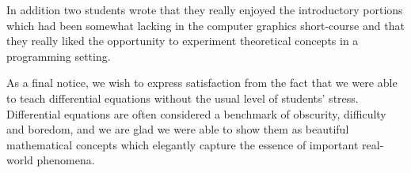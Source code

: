 In addition two students wrote that they really enjoyed the introductory portions which had been somewhat lacking in the computer graphics short-course and that they really liked the opportunity to experiment theoretical concepts in a programming setting.

As a final notice, we wish to express satisfaction from the fact that we were able to teach differential equations without the usual level of students' stress. Differential equations are often considered a benchmark of obscurity, difficulty and boredom, and we are glad we were able to show them as beautiful mathematical concepts which elegantly capture the essence of important real-world phenomena.

